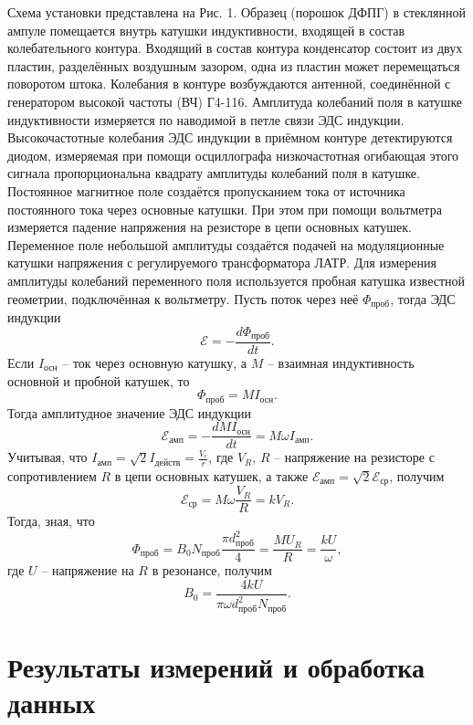 \documentclass[a4paper, 12pt]{article}
\begin{document}
Схема установки представлена на Рис. 1. Образец (порошок ДФПГ) в стеклянной ампуле помещается внутрь катушки индуктивности, входящей в состав колебательного контура. Входящий в состав контура конденсатор состоит из двух пластин, разделённых воздушным зазором, одна из пластин может перемещаться поворотом штока. Колебания в контуре возбуждаются антенной, соединённой с генератором высокой частоты (ВЧ) Г4-116. Амплитуда колебаний поля в катушке индуктивности
измеряется по наводимой в петле связи ЭДС индукции. Высокочастотные колебания ЭДС
индукции в приёмном контуре детектируются диодом, измеряемая при помощи
осциллографа низкочастотная огибающая этого сигнала пропорциональна квадрату
амплитуды колебаний поля в катушке.\\
Постоянное магнитное поле создаётся пропусканием тока от источника постоянного тока через основные катушки. При этом при помощи вольтметра измеряется падение напряжения на резисторе в цепи основных катушек. Переменное поле небольшой амплитуды создаётся подачей на модуляционные катушки напряжения с регулируемого трансформатора ЛАТР. Для измерения амплитуды колебаний переменного поля используется пробная катушка известной геометрии, подключённая к вольтметру. Пусть поток через неё $\Phi_{\text{проб}}$, тогда ЭДС индукции
\[\mathcal{E} = - \dfrac{d\Phi_{\text{проб}}}{dt}.\]
Если $I_{\text{осн}}$ -- ток через основную катушку, а $M$ -- взаимная индуктивность основной и пробной катушек, то
\[\Phi_{\text{проб}} = M I_{\text{осн}}.\]
Тогда амплитудное значение ЭДС индукции
\[\mathcal{E}_{\text{амп}} = - \dfrac{dM I_{\text{осн}}}{dt} = M \omega I_{\text{амп}}.\]
Учитывая, что $I_{\text{амп}} = \sqrt{2} I_{\text{действ}}=\frac{V_r}{r}$, где $V_R$, $R$ -- напряжение на резисторе с сопротивлением $R$ в цепи основных катушек, а также $\mathcal{E}_{\text{амп}} = \sqrt{2}\mathcal{E}_{\text{ср}}$, получим
\[\mathcal{E}_{\text{ср}} = M \omega \dfrac{V_R}{R} = k V_R.\]
Тогда, зная, что
\[\Phi_{\text{проб}} = B_0 N_{\text{проб}} \dfrac{\pi d_{\text{проб}}^2}{4} =  \dfrac{MU_R}{R} = \dfrac{k U}{\omega},\]
где $U$ -- напряжение на $R$ в резонансе, получим
\begin{equation}\label{1}
B_0 = \dfrac{4k U}{\pi \omega d^2_{\text{проб}} N_{\text{проб}}}.
\end{equation}

\section{Результаты измерений и обработка данных}
\end{document}

